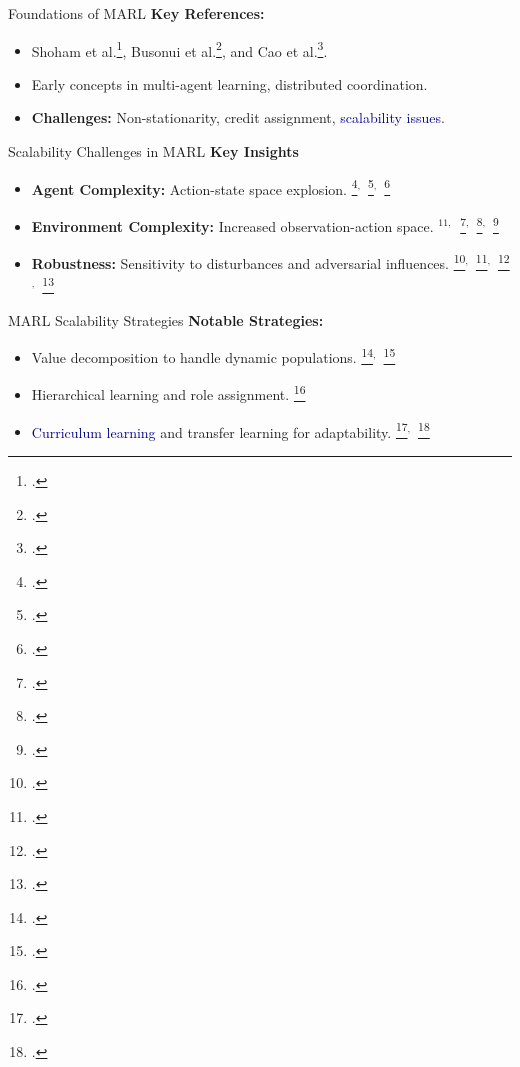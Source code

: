 \documentclass[xcolor={svgnames}]{beamer}
\begin{document}
\begin{frame}{Foundations of MARL}
    \textbf{Key References:}
    \begin{itemize}
        \item Shoham et al.\footcite{shoham2007a}, Busonui et al.\footcite{busoniu2008}, 
            and Cao et al.\footcite{cao2012}.
        \item Early concepts in multi-agent learning, distributed coordination.
        \item \textbf{Challenges:} Non-stationarity, credit assignment, 
            \textcolor{DarkBlue}{scalability issues}.
    \end{itemize}
\end{frame}

\begin{frame}{Scalability Challenges in MARL}
    \textbf{Key Insights}
    \begin{itemize}
        \item \textbf{Agent Complexity:} Action-state space explosion.
            \footcite{lillicrap2019}$^,$~\footcite{baker2019}$^,$~\footcite{leibo2021}
        \item \textbf{Environment Complexity:} Increased observation-action space.
            $^{11,}$~\footcite{ye2020}$^,$~\footcite{shukla2022}$^,$~\footcite{liang2024}
        \item \textbf{Robustness:} Sensitivity to disturbances and adversarial influences.
            \footcite{gleave2021}$^,$~\footcite{li2019}$^,$~\footcite{spooner2020}$^,$~\footcite{guo2022}
    \end{itemize}
    \vspace{0.5em}
\end{frame}


\begin{frame}{MARL Scalability Strategies}
    \textbf{Notable Strategies:}
    \begin{itemize}
        \item Value decomposition to handle dynamic populations.
            \footcite{zhang2021}$^,$~\footcite{nguyen2020}
        \item Hierarchical learning and role assignment.
            \footcite{cui2022}
        \item \textcolor{DarkBlue}{Curriculum learning} and transfer learning for adaptability.
            \footcite{shukla2022}$^,$~\footcite{shi2023}
    \end{itemize}
\end{frame}
\end{document}
